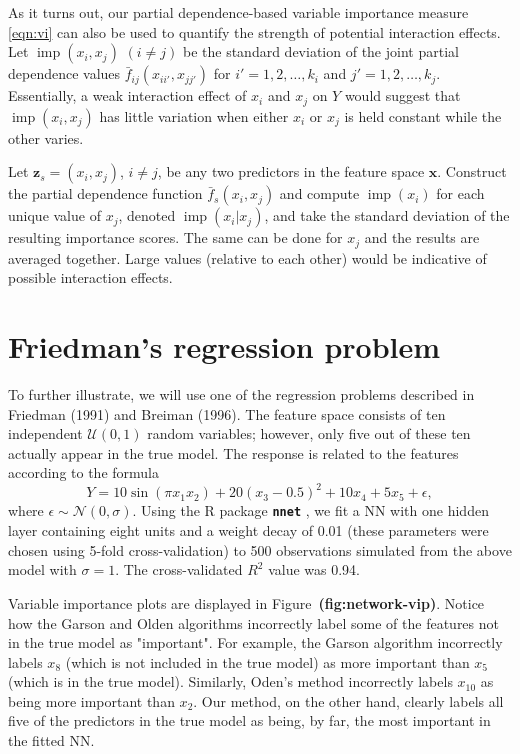 \documentclass[12pt]{article}
\newcommand{\pkg}[1]{\texorpdfstring%
{{\normalfont\fontseries{b}\selectfont #1}}%
{#1}}
\def\pkg#1{\textbf{\texttt{#1}}}
\def\ref#1{\textbf{(#1)}}
\DeclareMathOperator{\imp}{imp}
\begin{document}
As it turns out, our partial dependence-based variable importance measure \eqref{eqn:vi} can also be used to quantify the strength of potential interaction effects. Let $\imp\left(x_i, x_j\right)$ $\left(i \ne j\right)$ be the standard deviation of the joint partial dependence values $\bar{f}_{ij}\left(x_{ii'}, x_{jj'}\right)$ for $i' = 1, 2, \dots, k_i$ and  $j' = 1, 2, \dots, k_j$. Essentially, a weak interaction effect of $x_i$ and $x_j$ on $Y$ would suggest that $\imp\left(x_i, x_j\right)$ has little variation when either $x_i$ or $x_j$ is held constant while the other varies. 

Let $\boldsymbol{z}_s = \left(x_i, x_j\right)$, $i \neq j$, be any two predictors in the feature space $\boldsymbol{x}$. Construct the partial dependence function $\bar{f}_s\left(x_i, x_j\right)$ and compute $\imp\left(x_i\right)$ for each unique value of $x_j$, denoted $\imp\left(x_i | x_j\right)$, and take the standard deviation of the resulting importance scores. The same can be done for $x_j$ and the results are averaged together. Large values (relative to each other) would be indicative of possible interaction effects. 


\section{Friedman's regression problem}

To further illustrate, we will use one of the regression problems described in Friedman (1991) and Breiman (1996). The feature space consists of ten independent $\mathcal{U}\left(0, 1\right)$ random variables; however, only five out of these ten actually appear in the true model. The response is related to the features according to the formula
\begin{equation*}
Y = 10 \sin\left(\pi x_1 x_2\right) + 20 \left(x_3 - 0.5\right) ^ 2 + 10 x_4 + 5 x_5 + \epsilon,
\end{equation*}
where $\epsilon \sim \mathcal{N}\left(0, \sigma\right)$. Using the R package \pkg{nnet} \citep{venables-modern-2002}, we fit a NN with one hidden layer containing eight units and a weight decay of 0.01 (these parameters were chosen using 5-fold cross-validation) to 500 observations simulated from the above model with $\sigma = 1$. The cross-validated $R^2$ value was 0.94.

Variable importance plots are displayed in Figure~\ref{fig:network-vip}. Notice how the Garson and Olden algorithms incorrectly label some of the features not in the true model as "important". For example, the Garson algorithm incorrectly labels $x_8$ (which is not included in the true model) as more important than $x_5$ (which is in the true model). Similarly, Oden's method incorrectly labels $x_{10}$ as being more important than $x_2$. Our method, on the other hand, clearly labels all five of the predictors in the true model as being, by far, the most important in the fitted NN.
\end{document}
